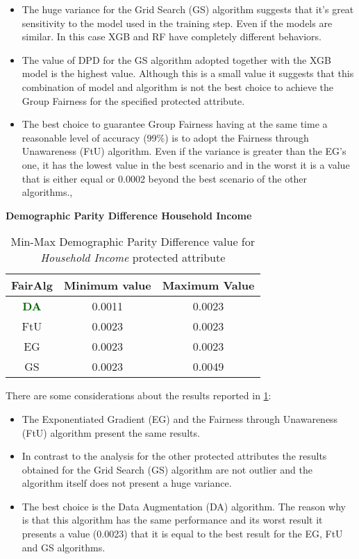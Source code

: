 \begin{itemize}
    \item The huge variance for the Grid Search (GS) algorithm suggests that it's great sensitivity to the model used in the training step. Even if the models are similar. In this case XGB and RF have completely different behaviors.

    \item The value of DPD for the GS algorithm adopted together with the XGB model is the highest value. Although this is a small value it suggests that this combination of model and algorithm is not the best choice to achieve the Group Fairness for the specified protected attribute.

    \item The best choice to guarantee Group Fairness having at the same time a reasonable level of accuracy (99\%) is to adopt the Fairness through Unawareness (FtU) algorithm. Even if the variance is greater than the EG's one, it has the lowest value in the best scenario and in the worst it is a value that is either equal or 0.0002 beyond the best scenario of the other algorithms., 
\end{itemize}

\textbf{Demographic Parity Difference Household Income}
\begin{table}
    \centering
    \begin{tabular}{|c|c|c|}
        \hline
        \textbf{FairAlg} & \textbf{Minimum value} & \textbf{Maximum Value} \\
        \hline
        \textcolor{darkgreen}{\textbf{DA}} & 0.0011 & 0.0023 \\
        \hline
        FtU & 0.0023 & 0.0023 \\
        \hline
        EG & 0.0023 & 0.0023 \\
        \hline
        GS & 0.0023 & 0.0049 \\
        \hline
    \end{tabular}
    \caption{Min-Max Demographic Parity Difference value for \emph{Household Income} protected attribute}
    \label{tab:h_dpd}
\end{table}

There are some considerations about the results reported in \cref{tab:h_dpd}:

\begin{itemize}
    \item The Exponentiated Gradient (EG) and the Fairness through Unawareness (FtU) algorithm present the same results.

    \item In contrast to the analysis for the other protected attributes the results obtained for the Grid Search (GS) algorithm are not outlier and the algorithm itself does not present a huge variance.

    \item The best choice is the Data Augmentation (DA) algorithm. The reason why is that this algorithm has the same performance and its worst result it presents a value (0.0023) that it is equal to the best result for the EG, FtU and GS algorithms.
\end{itemize}

